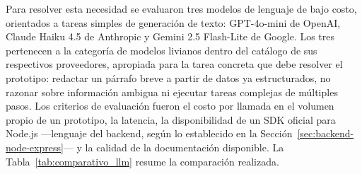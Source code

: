 Para resolver esta necesidad se evaluaron tres modelos de lenguaje de bajo costo, orientados a tareas simples de generación de texto: GPT-4o-mini de OpenAI, Claude Haiku 4.5 de Anthropic y Gemini 2.5 Flash-Lite de Google. Los tres pertenecen a la categoría de modelos livianos dentro del catálogo de sus respectivos proveedores, apropiada para la tarea concreta que debe resolver el prototipo: redactar un párrafo breve a partir de datos ya estructurados, no razonar sobre información ambigua ni ejecutar tareas complejas de múltiples pasos. Los criterios de evaluación fueron el costo por llamada en el volumen propio de un prototipo, la latencia, la disponibilidad de un SDK oficial para Node.js ---lenguaje del backend, según lo establecido en la Sección~\ref{sec:backend-node-express}--- y la calidad de la documentación disponible. La Tabla~\ref{tab:comparativo_llm} resume la comparación realizada.

